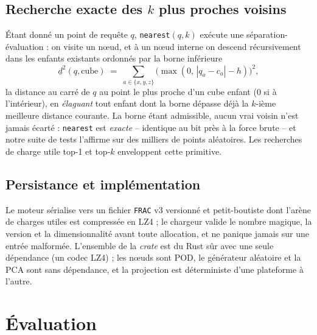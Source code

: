 \documentclass[11pt]{article}
\begin{document}
\subsection{Recherche exacte des $k$ plus proches voisins}
Étant donné un point de requête $q$, \texttt{nearest}$(q,k)$ exécute une
séparation-évaluation : on visite un n\oe{}ud, et à un n\oe{}ud interne on descend
récursivement dans les enfants existants ordonnés par la borne inférieure
\begin{equation}
\underline{d}^2(q,\text{cube}) \;=\; \sum_{a\in\{x,y,z\}} \big(\max(0,\,|q_a-c_a|-h)\big)^2,
\end{equation}
la distance au carré de $q$ au point le plus proche d'un cube enfant (0 si à
l'intérieur), en \emph{élaguant} tout enfant dont la borne dépasse déjà la $k$-ième
meilleure distance courante. La borne étant admissible, aucun vrai voisin n'est jamais
écarté : \texttt{nearest} est \emph{exacte} -- identique au bit près à la force brute
-- et notre suite de tests l'affirme sur des milliers de points aléatoires. Les
recherches de charge utile top-1 et top-$k$ enveloppent cette primitive.

\subsection{Persistance et implémentation}
Le moteur sérialise vers un fichier \texttt{FRAC} v3 versionné et petit-boutiste dont
l'arène de charges utiles est compressée en LZ4 ; le chargeur valide le nombre magique,
la version et la dimensionnalité avant toute allocation, et ne panique jamais sur une
entrée malformée. L'ensemble de la \emph{crate} est du Rust sûr avec une seule
dépendance (un codec LZ4) ; les n\oe{}uds sont POD, le générateur aléatoire et la PCA
sont sans dépendance, et la projection est déterministe d'une plateforme à l'autre.

\section{Évaluation}
\label{sec:eval}
\end{document}
